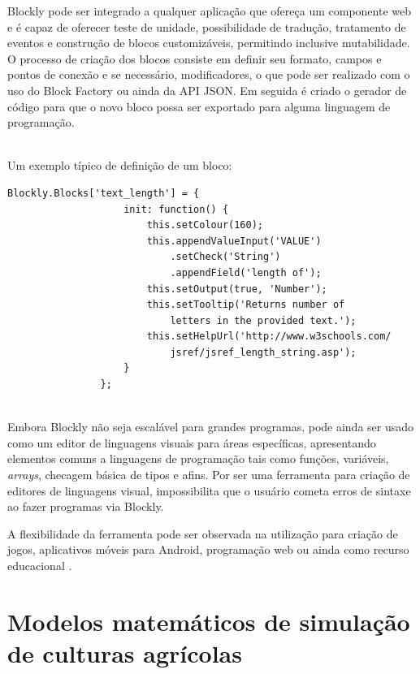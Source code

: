 \documentclass[tg]{mdtufsm}
\begin{document}
        	Blockly pode ser integrado a qualquer aplicação que ofereça um componente web e é capaz de oferecer teste de unidade, possibilidade de tradução, tratamento de eventos e construção de blocos customizáveis, permitindo inclusive mutabilidade. O processo de criação dos blocos consiste em definir seu formato, campos e pontos de conexão e se necessário, modificadores, o que pode ser realizado com o uso do Block Factory ou ainda da API JSON.
        	Em seguida é criado o gerador de código para que o novo bloco possa ser exportado para alguma linguagem de programação.

        	~\\
        	Um exemplo típico de definição de um bloco:
        	\begin{lstlisting}[frame=single]
                Blockly.Blocks['text_length'] = {
                    init: function() {
                        this.setColour(160);
                        this.appendValueInput('VALUE')
                            .setCheck('String')
                            .appendField('length of');
                        this.setOutput(true, 'Number');
                        this.setTooltip('Returns number of
                            letters in the provided text.');
                        this.setHelpUrl('http://www.w3schools.com/
                            jsref/jsref_length_string.asp');
                    }
                };
            \end{lstlisting}
        	~\\

        	Embora Blockly não seja escalável para grandes programas, pode ainda ser usado como um editor de linguagens visuais para áreas específicas, apresentando elementos comuns a linguagens de programação tais como funções, variáveis, \emph{arrays}, checagem básica de tipos e afins. Por ser uma ferramenta para criação de editores de linguagens visual, impossibilita que o usuário cometa erros de sintaxe ao fazer programas via Blockly.

        	A flexibilidade da ferramenta pode ser observada na utilização para criação de jogos, aplicativos móveis para Android, programação web ou ainda como recurso educacional \cite{BlocklyGames,Blocklymobile,BlocklyJavaScript,BlocklyEducation}.

    	\section{Modelos matemáticos de simulação de culturas agrícolas}
\end{document}
